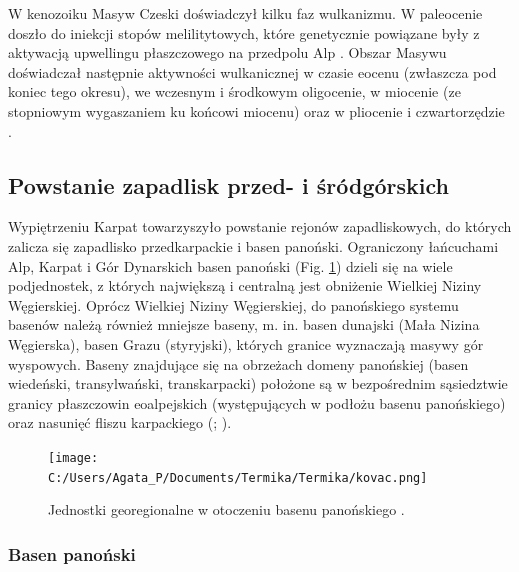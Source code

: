 \documentclass[11.5pt,twoside]{report}
\begin{document}
W kenozoiku Masyw Czeski doświadczył kilku faz wulkanizmu. W paleocenie doszło do iniekcji stopów melilitytowych, które genetycznie powiązane były z aktywacją upwellingu płaszczowego na przedpolu Alp \parencite{Dezes.2004}. Obszar Masywu doświadczał następnie aktywności wulkanicznej w czasie eocenu (zwłaszcza pod koniec tego okresu),  we wczesnym i środkowym oligocenie, w miocenie (ze stopniowym wygaszaniem ku końcowi miocenu) oraz w pliocenie i czwartorzędzie \parencite{Dezes.2004}. 


	
	
	\subsection{Powstanie zapadlisk przed- i śródgórskich}
	
Wypiętrzeniu Karpat towarzyszyło powstanie rejonów zapadliskowych, do których zalicza się zapadlisko przedkarpackie i basen panoński. Ograniczony łańcuchami Alp, Karpat i Gór Dynarskich basen panoński (Fig. \ref{kovac}) dzieli się na wiele podjednostek, z których największą i centralną jest obniżenie Wielkiej Niziny Węgierskiej. Oprócz Wielkiej Niziny Węgierskiej, do panońskiego systemu basenów należą również mniejsze baseny, m. in. basen dunajski (Mała Nizina Węgierska), basen Grazu (styryjski), których granice wyznaczają masywy gór wyspowych. Baseny znajdujące się na obrzeżach domeny panońskiej (basen wiedeński, transylwański, transkarpacki) położone są w bezpośrednim sąsiedztwie granicy płaszczowin eoalpejskich (występujących w podłożu basenu panońskiego) oraz nasunięć fliszu karpackiego (\cite{Kovac.2007}; \cite{Fodor.1999}).

\begin{figure}[h]
	\centering
	\texttt{[image: C:/Users/Agata\_P/Documents/Termika/Termika/kovac.png]}
	\caption{Jednostki georegionalne w otoczeniu basenu panońskiego \parencite{Kovac.2007}.}
	\label{kovac}
\end{figure}



		\subsubsection{Basen panoński}
\end{document}
